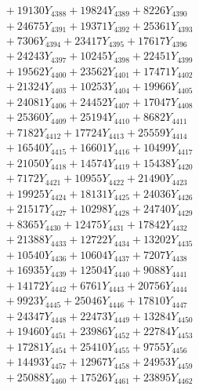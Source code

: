 \documentclass[a4paper,10pt]{article}
\begin{document}
{\begin{align}
&\;  + 19130 Y_{4388} + 19824 Y_{4389} + 8226 Y_{4390} \\[0.3ex]
&\;  + 24675 Y_{4391} + 19371 Y_{4392} + 25361 Y_{4393} \\[0.3ex]
&\;  + 7306 Y_{4394} + 23417 Y_{4395} + 17617 Y_{4396} \\[0.3ex]
&\;  + 24243 Y_{4397} + 10245 Y_{4398} + 22451 Y_{4399} \\[0.3ex]
&\;  + 19562 Y_{4400} + 23562 Y_{4401} + 17471 Y_{4402} \\[0.3ex]
&\;  + 21324 Y_{4403} + 10253 Y_{4404} + 19966 Y_{4405} \\[0.3ex]
&\;  + 24081 Y_{4406} + 24452 Y_{4407} + 17047 Y_{4408} \\[0.5ex]\allowbreak
&\;  + 25360 Y_{4409} + 25194 Y_{4410} + 8682 Y_{4411} \\[0.3ex]
&\;  + 7182 Y_{4412} + 17724 Y_{4413} + 25559 Y_{4414} \\[0.3ex]
&\;  + 16540 Y_{4415} + 16601 Y_{4416} + 10499 Y_{4417} \\[0.3ex]
&\;  + 21050 Y_{4418} + 14574 Y_{4419} + 15438 Y_{4420} \\[0.3ex]
&\;  + 7172 Y_{4421} + 10955 Y_{4422} + 21490 Y_{4423} \\[0.3ex]
&\;  + 19925 Y_{4424} + 18131 Y_{4425} + 24036 Y_{4426} \\[0.3ex]
&\;  + 21517 Y_{4427} + 10298 Y_{4428} + 24740 Y_{4429} \\[0.3ex]
&\;  + 8365 Y_{4430} + 12475 Y_{4431} + 17842 Y_{4432} \\[0.3ex]
&\;  + 21388 Y_{4433} + 12722 Y_{4434} + 13202 Y_{4435} \\[0.3ex]
&\;  + 10540 Y_{4436} + 10604 Y_{4437} + 7207 Y_{4438} \\[0.5ex]\allowbreak
&\;  + 16935 Y_{4439} + 12504 Y_{4440} + 9088 Y_{4441} \\[0.3ex]
&\;  + 14172 Y_{4442} + 6761 Y_{4443} + 20756 Y_{4444} \\[0.3ex]
&\;  + 9923 Y_{4445} + 25046 Y_{4446} + 17810 Y_{4447} \\[0.3ex]
&\;  + 24347 Y_{4448} + 22473 Y_{4449} + 13284 Y_{4450} \\[0.3ex]
&\;  + 19460 Y_{4451} + 23986 Y_{4452} + 22784 Y_{4453} \\[0.3ex]
&\;  + 17281 Y_{4454} + 25410 Y_{4455} + 9755 Y_{4456} \\[0.3ex]
&\;  + 14493 Y_{4457} + 12967 Y_{4458} + 24953 Y_{4459} \\[0.3ex]
&\;  + 25088 Y_{4460} + 17526 Y_{4461} + 23895 Y_{4462} \\[0.3ex]

\end{align}}
\end{document}
